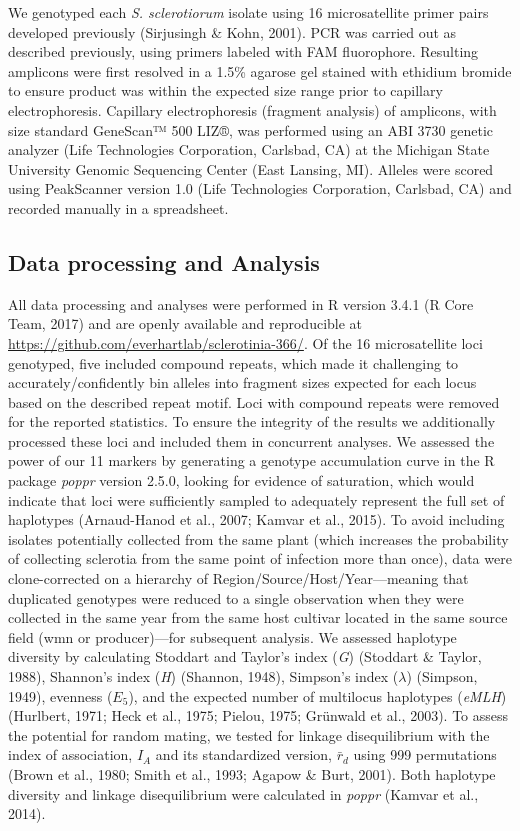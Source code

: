 \documentclass[fleqn,10pt,lineno]{wlpeerj} %
\theoremstyle{definition}
\theoremstyle{definition}
\theoremstyle{definition}
\theoremstyle{remark}
\begin{document}
We genotyped each \emph{S. sclerotiorum} isolate using 16 microsatellite
primer pairs developed previously (Sirjusingh \& Kohn, 2001). PCR was
carried out as described previously, using primers labeled with FAM
fluorophore. Resulting amplicons were first resolved in a 1.5\% agarose
gel stained with ethidium bromide to ensure product was within the
expected size range prior to capillary electrophoresis. Capillary
electrophoresis (fragment analysis) of amplicons, with size standard
GeneScan™ 500 LIZ®, was performed using an ABI 3730 genetic analyzer
(Life Technologies Corporation, Carlsbad, CA) at the Michigan State
University Genomic Sequencing Center (East Lansing, MI). Alleles were
scored using PeakScanner version 1.0 (Life Technologies Corporation,
Carlsbad, CA) and recorded manually in a spreadsheet.

\subsection*{Data processing and
Analysis}\label{data-processing-and-analysis}

All data processing and analyses were performed in R version 3.4.1 (R
Core Team, 2017) and are openly available and reproducible at
\url{https://github.com/everhartlab/sclerotinia-366/}. Of the 16
microsatellite loci genotyped, five included compound repeats, which
made it challenging to accurately/confidently bin alleles into fragment
sizes expected for each locus based on the described repeat motif. Loci
with compound repeats were removed for the reported statistics. To
ensure the integrity of the results we additionally processed these loci
and included them in concurrent analyses. We assessed the power of our
11 markers by generating a genotype accumulation curve in the R package
\emph{poppr} version 2.5.0, looking for evidence of saturation, which
would indicate that loci were sufficiently sampled to adequately
represent the full set of haplotypes (Arnaud-Hanod et al., 2007; Kamvar
et al., 2015). To avoid including isolates potentially collected from
the same plant (which increases the probability of collecting sclerotia
from the same point of infection more than once), data were
clone-corrected on a hierarchy of Region/Source/Host/Year---meaning that
duplicated genotypes were reduced to a single observation when they were
collected in the same year from the same host cultivar located in the
same source field (wmn or producer)---for subsequent analysis. We
assessed haplotype diversity by calculating Stoddart and Taylor's index
(\emph{G}) (Stoddart \& Taylor, 1988), Shannon's index (\emph{H})
(Shannon, 1948), Simpson's index (\(\lambda\)) (Simpson, 1949), evenness
(\(E_5\)), and the expected number of multilocus haplotypes
(\emph{eMLH}) (Hurlbert, 1971; Heck et al., 1975; Pielou, 1975; Grünwald
et al., 2003). To assess the potential for random mating, we tested for
linkage disequilibrium with the index of association, \(I_A\) and its
standardized version, \(\bar{r}_d\) using 999 permutations (Brown et
al., 1980; Smith et al., 1993; Agapow \& Burt, 2001). Both haplotype
diversity and linkage disequilibrium were calculated in \emph{poppr}
(Kamvar et al., 2014).
\end{document}

